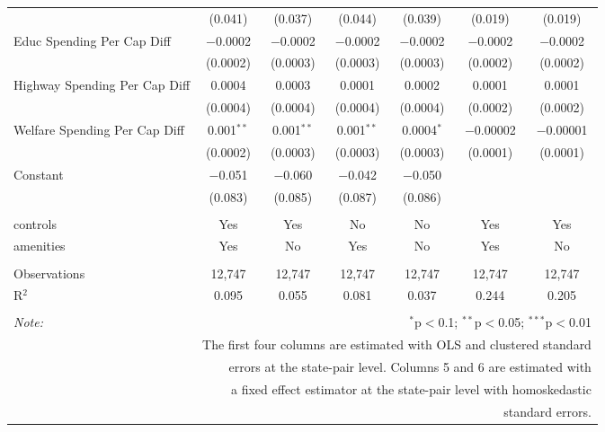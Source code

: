 \begin{table}[!htbp]
\begin{tabular}{@{\extracolsep{5pt}}lcccccc}
  & (0.041) & (0.037) & (0.044) & (0.039) & (0.019) & (0.019) \\ 
  Educ Spending Per Cap Diff & $-$0.0002 & $-$0.0002 & $-$0.0002 & $-$0.0002 & $-$0.0002 & $-$0.0002 \\ 
  & (0.0002) & (0.0003) & (0.0003) & (0.0003) & (0.0002) & (0.0002) \\ 
  Highway Spending Per Cap Diff & 0.0004 & 0.0003 & 0.0001 & 0.0002 & 0.0001 & 0.0001 \\ 
  & (0.0004) & (0.0004) & (0.0004) & (0.0004) & (0.0002) & (0.0002) \\ 
  Welfare Spending Per Cap Diff & 0.001$^{**}$ & 0.001$^{**}$ & 0.001$^{**}$ & 0.0004$^{*}$ & $-$0.00002 & $-$0.00001 \\ 
  & (0.0002) & (0.0003) & (0.0003) & (0.0003) & (0.0001) & (0.0001) \\ 
  Constant & $-$0.051 & $-$0.060 & $-$0.042 & $-$0.050 &  &  \\ 
  & (0.083) & (0.085) & (0.087) & (0.086) &  &  \\ 
 \hline \\[-1.8ex] 
controls & Yes & Yes & No & No & Yes & Yes \\ 
amenities & Yes & No & Yes & No & Yes & No \\ 
\hline \\[-1.8ex] 
Observations & 12,747 & 12,747 & 12,747 & 12,747 & 12,747 & 12,747 \\ 
R$^{2}$ & 0.095 & 0.055 & 0.081 & 0.037 & 0.244 & 0.205 \\ 
\hline 
\hline \\[-1.8ex] 
\textit{Note:}  & \multicolumn{6}{r}{$^{*}$p$<$0.1; $^{**}$p$<$0.05; $^{***}$p$<$0.01} \\ 
 & \multicolumn{6}{r}{The first four columns are estimated with OLS and clustered standard} \\ 
 & \multicolumn{6}{r}{ errors at the state-pair level. Columns 5 and 6 are estimated with} \\ 
 & \multicolumn{6}{r}{a fixed effect estimator at the state-pair level with homoskedastic} \\ 
 & \multicolumn{6}{r}{standard errors.} \\ 
\end{tabular} 
\end{table} 
